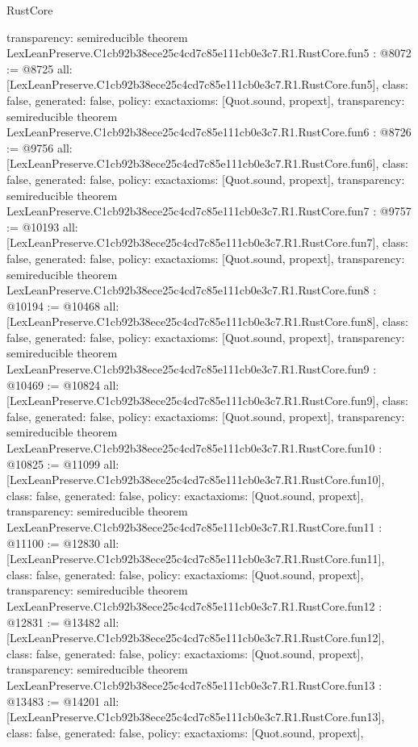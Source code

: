 \begin{lexlean}{RustCore}
\begin{coremodule}
{  transparency: semireducible
}
theorem LexLeanPreserve.C1cb92b38ece25c4cd7c85e111cb0e3c7.R1.RustCore.fun5 : @8072 := @8725 {
  all: [LexLeanPreserve.C1cb92b38ece25c4cd7c85e111cb0e3c7.R1.RustCore.fun5],
  class: false,
  generated: false,
  policy: exact{axioms: [Quot.sound, propext]},
  transparency: semireducible
}
theorem LexLeanPreserve.C1cb92b38ece25c4cd7c85e111cb0e3c7.R1.RustCore.fun6 : @8726 := @9756 {
  all: [LexLeanPreserve.C1cb92b38ece25c4cd7c85e111cb0e3c7.R1.RustCore.fun6],
  class: false,
  generated: false,
  policy: exact{axioms: [Quot.sound, propext]},
  transparency: semireducible
}
theorem LexLeanPreserve.C1cb92b38ece25c4cd7c85e111cb0e3c7.R1.RustCore.fun7 : @9757 := @10193 {
  all: [LexLeanPreserve.C1cb92b38ece25c4cd7c85e111cb0e3c7.R1.RustCore.fun7],
  class: false,
  generated: false,
  policy: exact{axioms: [Quot.sound, propext]},
  transparency: semireducible
}
theorem LexLeanPreserve.C1cb92b38ece25c4cd7c85e111cb0e3c7.R1.RustCore.fun8 : @10194 := @10468 {
  all: [LexLeanPreserve.C1cb92b38ece25c4cd7c85e111cb0e3c7.R1.RustCore.fun8],
  class: false,
  generated: false,
  policy: exact{axioms: [Quot.sound, propext]},
  transparency: semireducible
}
theorem LexLeanPreserve.C1cb92b38ece25c4cd7c85e111cb0e3c7.R1.RustCore.fun9 : @10469 := @10824 {
  all: [LexLeanPreserve.C1cb92b38ece25c4cd7c85e111cb0e3c7.R1.RustCore.fun9],
  class: false,
  generated: false,
  policy: exact{axioms: [Quot.sound, propext]},
  transparency: semireducible
}
theorem LexLeanPreserve.C1cb92b38ece25c4cd7c85e111cb0e3c7.R1.RustCore.fun10 : @10825 := @11099 {
  all: [LexLeanPreserve.C1cb92b38ece25c4cd7c85e111cb0e3c7.R1.RustCore.fun10],
  class: false,
  generated: false,
  policy: exact{axioms: [Quot.sound, propext]},
  transparency: semireducible
}
theorem LexLeanPreserve.C1cb92b38ece25c4cd7c85e111cb0e3c7.R1.RustCore.fun11 : @11100 := @12830 {
  all: [LexLeanPreserve.C1cb92b38ece25c4cd7c85e111cb0e3c7.R1.RustCore.fun11],
  class: false,
  generated: false,
  policy: exact{axioms: [Quot.sound, propext]},
  transparency: semireducible
}
theorem LexLeanPreserve.C1cb92b38ece25c4cd7c85e111cb0e3c7.R1.RustCore.fun12 : @12831 := @13482 {
  all: [LexLeanPreserve.C1cb92b38ece25c4cd7c85e111cb0e3c7.R1.RustCore.fun12],
  class: false,
  generated: false,
  policy: exact{axioms: [Quot.sound, propext]},
  transparency: semireducible
}
theorem LexLeanPreserve.C1cb92b38ece25c4cd7c85e111cb0e3c7.R1.RustCore.fun13 : @13483 := @14201 {
  all: [LexLeanPreserve.C1cb92b38ece25c4cd7c85e111cb0e3c7.R1.RustCore.fun13],
  class: false,
  generated: false,
  policy: exact{axioms: [Quot.sound, propext]},
}
\end{coremodule}
\end{lexlean}

